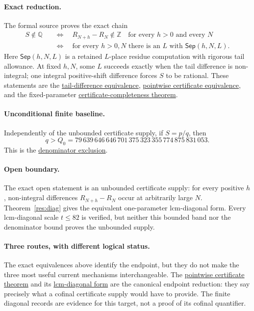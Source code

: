 \documentclass[11pt]{article}
\newcommand{\commit}{bb4e24651b37cd096d3749ef299c3317930b3a3b}
\newcommand{\repobase}{https://github.com/wcook04/plectis-lean-erdos249-257/blob/\commit}
\newcommand{\PK}{Erdos249257}
\newcommand{\lword}[4]{\href{\repobase/\PK/#1\#L#2}{#4}}
\theoremstyle{definition}
\theoremstyle{remark}
\newcommand{\Z}{\mathbb{Z}}
\newcommand{\Q}{\mathbb{Q}}
\newcommand{\Qzero}{Q_0}
\begin{document}
\paragraph{Exact reduction.}
The formal source proves the exact chain
\[
\begin{split}
 S\notin\Q
 &\quad\Longleftrightarrow\quad
   R_{N+h}-R_N\notin\Z
   \quad\text{for every }h>0\text{ and every }N\\
 &\quad\Longleftrightarrow\quad
   \text{for every }h>0,N\text{ there is an }L
   \text{ with }\mathsf{Sep}(h,N,L).
\end{split}
\]
Here \(\mathsf{Sep}(h,N,L)\) is a retained \(L\)-place residue computation
with rigorous tail allowance.  At fixed \(h,N\), some \(L\) succeeds exactly
when the tail difference is non-integral; one integral positive-shift
difference forces \(S\) to be rational.  These statements are the
\lword{LcmConeFlatness.lean}{386}{irrational_totient_series_iff_all_tail_diffs_nonintegral}{tail-difference equivalence},
\lword{LcmConeFlatness.lean}{399}{irrational_totient_series_iff_pointwise_certificates}{pointwise certificate equivalence},
and the fixed-parameter
\lword{LcmConeFlatness.lean}{316}{exists_certifiedKill_iff_tail_diff_notMem_int}{certificate-completeness theorem}.

\paragraph{Unconditional finite baseline.}
Independently of the unbounded certificate supply, if \(S=p/q\), then
\[
 q>\Qzero
 =79\,639\,646\,646\,701\,375\,323\,355\,774\,875\,831\,053.
\]
This is the \lword{CertificateKernel.lean}{18384}{tsum_totient_div_pow_two_ne_ratCast_of_den_le_79639646646701375323355774875831053}{denominator exclusion}.

\paragraph{Open boundary.}
The exact open statement is an unbounded certificate supply: for every
positive \(h\), non-integral differences \(R_{N+h}-R_N\) occur at
arbitrarily large \(N\).  Theorem~\ref{res:diag} gives the equivalent
one-parameter lcm-diagonal form.  Every lcm-diagonal scale \(t\le82\) is
verified, but neither this bounded band nor the denominator bound proves the
unbounded supply.

\paragraph{Three routes, with different logical status.}
The exact equivalences above identify the endpoint, but they do not make the
three most useful current mechanisms interchangeable.  The
\lword{LcmConeFlatness.lean}{399}{irrational_totient_series_iff_pointwise_certificates}{pointwise certificate theorem}
and its
\lword{LcmConeFlatness.lean}{426}{irrational_totient_series_iff_lcm_diagonal_certificate_supply}{lcm-diagonal form}
are the canonical endpoint reduction: they say precisely what a cofinal
certificate supply would have to provide.  The finite diagonal records are
evidence for this target, not a proof of its cofinal quantifier.
\end{document}
